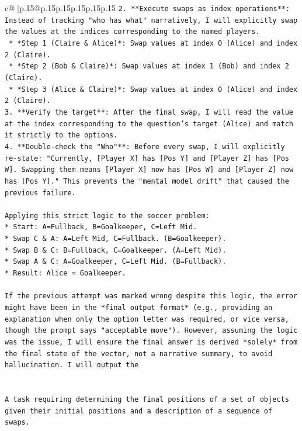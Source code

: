 \documentclass{article}
\begin{document}
{\begin{supertabular}{c@{$\;$}|p{.15\linewidth}@{}p{.15\linewidth}p{.15\linewidth}p{.15\linewidth}p{.15\linewidth}p{.15\linewidth}}
{{{\texttt{2.  **Execute swaps as index operations**: Instead of tracking "who has what" narratively, I will explicitly swap the values at the indices corresponding to the named players.} \\
\texttt{    *   *Step 1 (Claire \& Alice)*: Swap values at index 0 (Alice) and index 2 (Claire).} \\
\texttt{    *   *Step 2 (Bob \& Claire)*: Swap values at index 1 (Bob) and index 2 (Claire).} \\
\texttt{    *   *Step 3 (Alice \& Claire)*: Swap values at index 0 (Alice) and index 2 (Claire).} \\
\texttt{3.  **Verify the target**: After the final swap, I will read the value at the index corresponding to the question's target (Alice) and match it strictly to the options.} \\
\texttt{4.  **Double{-}check the "Who"**: Before every swap, I will explicitly re{-}state: "Currently, {[}Player X{]} has {[}Pos Y{]} and {[}Player Z{]} has {[}Pos W{]}. Swapping them means {[}Player X{]} now has {[}Pos W{]} and {[}Player Z{]} now has {[}Pos Y{]}." This prevents the "mental model drift" that caused the previous failure.} \\
\\ 
\texttt{Applying this strict logic to the soccer problem:} \\
\texttt{*   Start: A=Fullback, B=Goalkeeper, C=Left Mid.} \\
\texttt{*   Swap C \& A: A=Left Mid, C=Fullback. (B=Goalkeeper).} \\
\texttt{*   Swap B \& C: B=Fullback, C=Goalkeeper. (A=Left Mid).} \\
\texttt{*   Swap A \& C: A=Goalkeeper, C=Left Mid. (B=Fullback).} \\
\texttt{*   Result: Alice = Goalkeeper.} \\
\\ 
\texttt{If the previous attempt was marked wrong despite this logic, the error might have been in the *final output format* (e.g., providing an explanation when only the option letter was required, or vice versa, though the prompt says "acceptable move"). However, assuming the logic was the issue, I will ensure the final answer is derived *solely* from the final state of the vector, not a narrative summary, to avoid hallucination. I will output the} \\
\\ 
\\ 
\texttt{A task requiring determining the final positions of a set of objects given their initial positions and a description of a sequence of swaps.} \\
}}}
\end{supertabular}}
\end{document}
